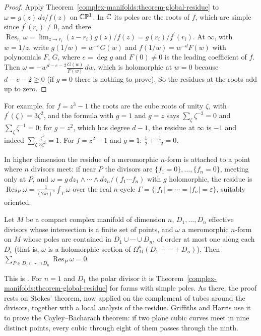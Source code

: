 \begin{proof}
Apply Theorem~\ref{complex-manifolds:theorem-global-residue} to $\omega = g(z)\,dz/f(z)$ on $\mathbb{C}\mathbb{P}^1$. In $\mathbb{C}$ its poles are the roots of $f$, which are simple since $f^{\prime}(r_i) \neq 0$, and there
$\operatorname{Res}_{r_i}\omega = \lim_{z \to r_i}(z - r_i)g(z)/f(z) = g(r_i)/f^{\prime}(r_i)$. At $\infty$, with $w = 1/z$, write $g(1/w) = w^{-e}G(w)$ and $f(1/w) = w^{-d}F(w)$ with polynomials $F$, $G$,
where $e = \deg g$ and $F(0) \neq 0$ is the leading coefficient of $f$. Then $\omega = -w^{d-e-2}\frac{G(w)}{F(w)}\,dw$, which is holomorphic at $w = 0$ because $d - e - 2 \geq 0$ (if $g = 0$ there is nothing to prove).
So the residues at the roots add up to zero.
\end{proof}

For example, for $f = z^3 - 1$ the roots are the cube roots of unity $\zeta$, with $f^{\prime}(\zeta) = 3\zeta^2$, and the formula with $g = 1$ and $g = z$ says $\sum_\zeta\zeta^{-2} = 0$ and $\sum_\zeta\zeta^{-1} = 0$;
for $g = z^2$, which has degree $d - 1$, the residue at $\infty$ is $-1$ and indeed $\sum_\zeta\frac{\zeta^2}{3\zeta^2} = 1$. For $f = z^2 - 1$ and $g = 1$: $\frac{1}{2} + \frac{1}{-2} = 0$.

In higher dimension the residue of a meromorphic $n$-form is attached to a point where $n$ divisors meet: if near $P$ the divisors are $\{f_1 = 0\}, \ldots, \{f_n = 0\}$, meeting only at $P$, and
$\omega = g\,dz_1 \wedge \cdots \wedge dz_n/(f_1 \cdots f_n)$ with $g$ holomorphic, the residue is
$\operatorname{Res}_P\omega = \frac{1}{(2\pi i)^n}\int_\Gamma\omega$ over the real $n$-cycle $\Gamma = \{|f_1| = \cdots = |f_n| = \varepsilon\}$, suitably oriented.

\begin{theorem}\label{complex-manifolds:theorem-global-residue-higher}
Let $M$ be a compact complex manifold of dimension $n$, $D_1, \ldots, D_n$ effective divisors whose intersection is a finite set of points, and $\omega$ a meromorphic $n$-form on $M$ whose poles are
contained in $D_1 \cup \cdots \cup D_n$, of order at most one along each $D_i$ (that is, $\omega$ is a holomorphic section of $\Omega^n_M(D_1 + \cdots + D_n)$). Then
$\sum_{P \in D_1 \cap \cdots \cap D_n}\operatorname{Res}_P\omega = 0$.
\end{theorem}

This is \cite[Chapter 5]{griffiths-harris}. For $n = 1$ and $D_1$ the polar divisor it is Theorem~\ref{complex-manifolds:theorem-global-residue} for forms with simple poles. As there, the proof rests on
Stokes' theorem, now applied on the complement of tubes around the divisors, together with a local analysis of the residue. Griffiths and Harris use it to prove the Cayley--Bacharach theorem: if two plane
cubic curves meet in nine distinct points, every cubic through eight of them passes through the ninth.

